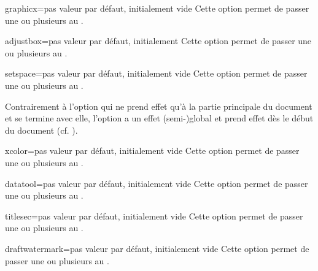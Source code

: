 \begin{docKey}{graphicx}{=}{pas valeur par défaut,
    initialement vide}
  Cette option permet de passer une ou plusieurs  au
  .
\end{docKey}
\begin{docKey}{adjustbox}{=}{pas valeur par défaut,
    initialement }
  Cette option permet de passer une ou plusieurs  au
  .
\end{docKey}
\begin{docKey}{setspace}{=}{pas valeur par défaut,
    initialement vide}
  Cette option permet de passer une ou plusieurs  au
  .

  Contrairement à l'option  qui ne prend effet qu'à la partie
  principale du document et se termine avec elle, l'option 
  a un effet (semi-)global et prend effet dès le début du document
  (cf. ).
\end{docKey}
\begin{docKey}{xcolor}{=}{pas valeur par défaut,
    initialement vide}
  Cette option permet de passer une ou plusieurs  au
  .
\end{docKey}
\begin{docKey}{datatool}{=}{pas valeur par défaut,
    initialement vide}
  Cette option permet de passer une ou plusieurs  au
  .
\end{docKey}
\begin{docKey}{titlesec}{=}{pas valeur par défaut, initialement
    vide}
  Cette option permet de passer une ou plusieurs  au
  .
\end{docKey}
\begin{docKey}{draftwatermark}{=}{pas valeur par défaut,
    initialement vide}
  Cette option permet de passer une ou plusieurs  au
  .
\end{docKey}
